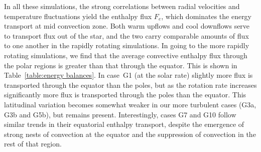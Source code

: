 In all these simulations, the strong correlations between radial
velocities and temperature fluctuations yield the enthalpy flux $F_e$,
which dominates the energy transport at mid convection zone.  
Both warm upflows and cool downflows serve to transport flux out of
the star, and the two carry comparable amounts of flux to one another
in the rapidly rotating simulations. 
In going to the more rapidly rotating simulations, we find that the
average convective enthalpy flux through the polar regions is greater
than that through the equator.  This is shown in
Table~\ref{table:energy balances}.  In case~G1 (at the solar rate)
slightly more flux is transported through the equator than the poles, but
as the rotation rate increases significantly more flux is transported
through the poles than the equator.  This latitudinal variation
becomes somewhat weaker in our more turbulent cases (G3a, G3b and
G5b), but remains present.  Interestingly, cases G7 and G10 follow
similar trends in their equatorial enthalpy transport, despite the
emergence of strong nests of convection at the equator and the
suppression of convection in the rest of that region.



%
%
%

